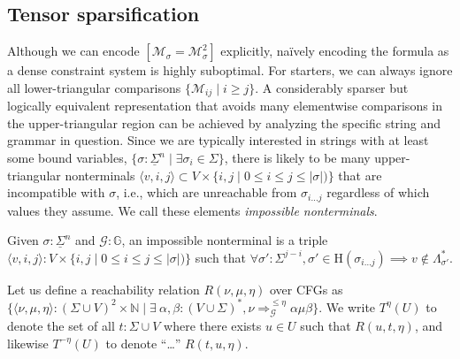 \documentclass[sigplan,review,anonymous,acmsmall]{acmart}\settopmatter{printfolios=false,printccs=false,printacmref=false}
\begin{document}


%

\subsection{Tensor sparsification}

Although we can encode $[\mathcal{M}_\sigma = \mathcal{M}^2_\sigma]$ explicitly, na\"ively encoding the formula as a dense constraint system is highly suboptimal. For starters, we can always ignore all lower-triangular comparisons $\{\mathcal{M}_{ij} \mid i \geq j\}$. A considerably sparser but logically equivalent representation that avoids many elementwise comparisons in the upper-triangular region can be achieved by analyzing the specific string and grammar in question. Since we are typically interested in strings with at least some bound variables, $\{\sigma: \underline\Sigma^n \mid \exists \sigma_i \in \Sigma\}$, there is likely to be many upper-triangular nonterminals $\langle v, i, j\rangle \subset V\times\{i, j \mid 0 \leq i \leq j \leq |\sigma|)\}$ that are incompatible with $\sigma$, i.e., which are unreachable from $\sigma_{i\ldots j}$ regardless of which values they assume. We call these elements \textit{impossible nonterminals}.

\begin{definition}
  Given $\sigma: \underline\Sigma^n$ and $\mathcal{G}: \mathbb{G}$, an impossible nonterminal is a triple $\langle v, i, j\rangle: V\times\{i, j \mid 0 \leq i \leq j \leq |\sigma|)\}$ such that $\forall \sigma': \Sigma^{j-i}, \sigma' \in \text{H}(\sigma_{i\ldots j}) \implies v\notin\Lambda^*_{\sigma'}$.
\end{definition}

\begin{definition}[CFG reachability]
  Let us define a reachability relation $R(\nu, \mu, \eta)$ over CFGs as $\{\langle\nu, \mu, \eta\rangle: (\Sigma \cup V)^2\times\mathbb{N} \mid \exists\:\alpha, \beta: (V\cup\Sigma)^*, \nu \Rightarrow^{\leq \eta}_\mathcal{G} \alpha \mu \beta\}$. We write $T^\eta(U)$ to denote the set of all $t: \Sigma \cup V$ where there exists $u\in U$ such that $R(u, t, \eta)$, and likewise $T^{-\eta}(U)$ to denote ``\ldots'' $R(t, u, \eta)$.
\end{definition}
\end{document}
